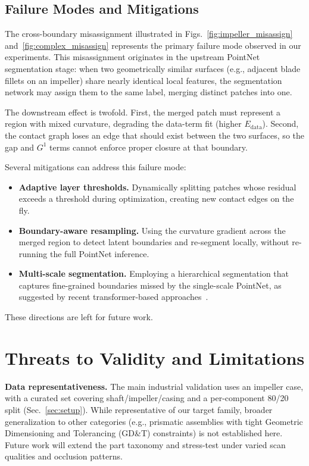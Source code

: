\documentclass{ieeeaccess}
\begin{document}
\subsection{Failure Modes and Mitigations}
\label{sec:failure_modes}
The cross-boundary misassignment illustrated in Figs.~\ref{fig:impeller_misassign} and~\ref{fig:complex_misassign} represents the primary failure mode observed in our experiments. This misassignment originates in the upstream PointNet segmentation stage: when two geometrically similar surfaces (e.g., adjacent blade fillets on an impeller) share nearly identical local features, the segmentation network may assign them to the same label, merging distinct patches into one.

The downstream effect is twofold. First, the merged patch must represent a region with mixed curvature, degrading the data-term fit (higher $E_{\text{data}}$). Second, the contact graph loses an edge that should exist between the two surfaces, so the gap and $G^1$ terms cannot enforce proper closure at that boundary.

Several mitigations can address this failure mode:
\begin{itemize}
  \item \textbf{Adaptive layer thresholds.} Dynamically splitting patches whose residual exceeds a threshold during optimization, creating new contact edges on the fly.
  \item \textbf{Boundary-aware resampling.} Using the curvature gradient across the merged region to detect latent boundaries and re-segment locally, without re-running the full PointNet inference.
  \item \textbf{Multi-scale segmentation.} Employing a hierarchical segmentation that captures fine-grained boundaries missed by the single-scale PointNet, as suggested by recent transformer-based approaches~\cite{b23}.
\end{itemize}
These directions are left for future work.

\section{Threats to Validity and Limitations}
\label{sec:limitations}

\textbf{Data representativeness.} The main industrial validation uses an
impeller case, with a curated set covering shaft/impeller/casing and a
per-component 80/20 split (Sec.~\ref{sec:setup}). While representative of our
target family, broader generalization to other categories (e.g., prismatic
assemblies with tight Geometric Dimensioning and Tolerancing (GD\&T) constraints) is not established here. Future
work will extend the part taxonomy and stress-test under varied scan
qualities and occlusion patterns.
\end{document}
